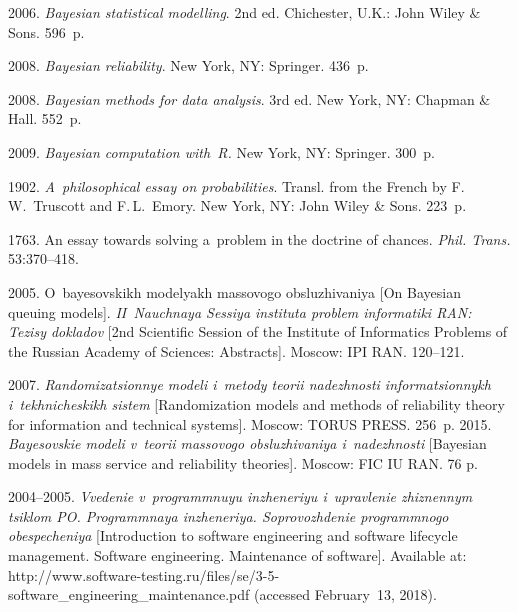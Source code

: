 \begin{multicols}{2}
{{\begin{thebibliography}{99}
 2006. \textit{Bayesian statistical modelling}. 2nd ed. 
 Chichester, U.K.: John Wiley \& Sons. 596~p.

 2008. 
\textit{Bayesian reliability}. New York, NY: Springer. 436~p.

 2008. \textit{Bayesian methods for data analysis}. 
3rd ed. New York,  NY: Chapman \& Hall. 552~p.

 2009. \textit{Bayesian computation with~R.}
New York,  NY: Springer. 300~p.

 1902. 
\textit{A~philosophical essay on probabilities}. 
Transl. from the French by F.\,W.~Truscott and F.\,L.~Emory. 
New York, NY: John Wiley \& Sons. 223~p.

 1763. 
An essay towards solving a~problem in the doctrine of chances. 
\textit{Phil. Trans.} 53:370--418.

 2005. 
O~bayesovskikh modelyakh massovogo obsluzhivaniya [On Bayesian queuing models]. 
\textit{II~Nauchnaya Sessiya instituta problem informatiki RAN: Tezisy dokladov} 
[2nd Scientific Session of the Institute of Informatics Problems of the 
Russian Academy of Sciences: Abstracts]. Moscow: IPI RAN. 120--121.

 2007. 
\textit{Randomizatsionnye modeli i~metody teorii nadezhnosti informatsionnykh 
i~tekhnicheskikh sistem} [Randomization models and methods of reliability theory 
for information and technical systems]. Moscow: TORUS PRESS. 256~p.
 2015. 
\textit{Bayesovskie modeli v~teorii massovogo obsluzhivaniya i~nadezhnosti} 
[Bayesian models in mass service and reliability theories]. Moscow: FIC IU RAN. 76 p.

 2004--2005.
\textit{Vvedenie v~programmnuyu inzheneriyu i~upravlenie zhiznennym tsiklom PO. 
Programmnaya inzheneriya. Soprovozhdenie programmnogo obespecheniya} 
[Introduction to software engineering and software lifecycle management. 
Software engineering. Maintenance of software]. 
Available at: 
{\sf http://www.\linebreak software-testing.ru/files/se/3-5-software\_engineering\_\linebreak maintenance.pdf}
 (accessed February~13, 2018).






\end{thebibliography}}}
\end{multicols}
